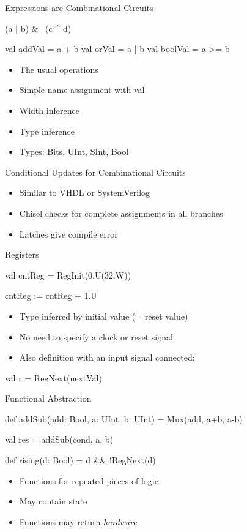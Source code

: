 \begin{frame}[fragile]{Expressions are Combinational Circuits}
\begin{chisel}
(a | b) & ~(c ^ d)

val addVal = a + b
val orVal = a | b
val boolVal = a >= b
\end{chisel}
\begin{itemize}
\item The usual operations 
\item Simple name assignment with val
\item Width inference
\item Type inference
\item Types: Bits, UInt, SInt, Bool
\end{itemize}
\end{frame}

\begin{frame}[fragile]{Conditional Updates for Combinational Circuits}
\begin{itemize}
\item Similar to VHDL  or SystemVerilog 
\item Chisel checks for complete assignments in all branches
\item Latches give compile error
\end{itemize}
\end{frame}

\begin{frame}[fragile]{Registers}
\begin{chisel}
val cntReg = RegInit(0.U(32.W))

cntReg := cntReg + 1.U
\end{chisel}
\begin{itemize}
\item Type inferred by initial value (= reset value)
\item No need to specify a clock or reset signal
\end{itemize}
\begin{itemize}
\item Also definition with an input signal connected:
\end{itemize}
\begin{chisel}
val r = RegNext(nextVal) 
\end{chisel}
\end{frame}

\begin{frame}[fragile]{Functional Abstraction}
\begin{chisel}
  def addSub(add: Bool, a: UInt, b: UInt) =
    Mux(add, a+b, a-b)

  val res = addSub(cond, a, b)
  
  def rising(d: Bool) = d && !RegNext(d)
\end{chisel}
\begin{itemize}
\item Functions for repeated pieces of logic
\item May contain state
\item Functions may return \emph{hardware}
\end{itemize}
\end{frame}


